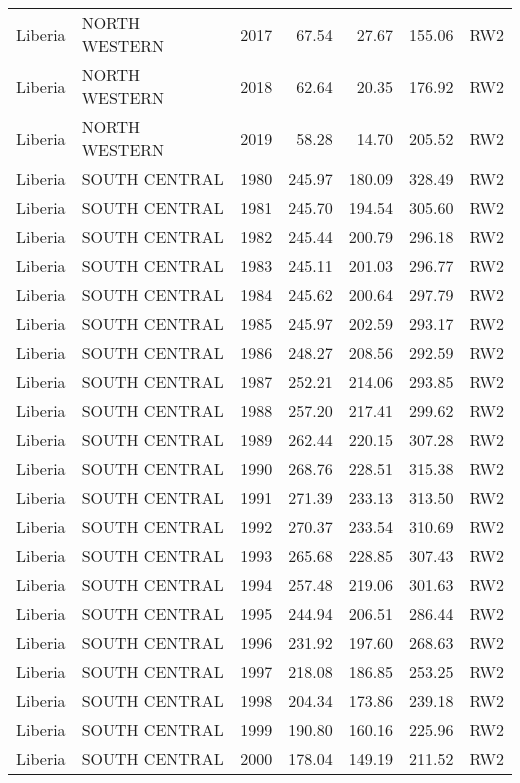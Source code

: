 \begin{longtable}{lllrrrl}
  Liberia & NORTH WESTERN & 2017 & 67.54 & 27.67 & 155.06 & RW2 \\ 
  Liberia & NORTH WESTERN & 2018 & 62.64 & 20.35 & 176.92 & RW2 \\ 
  Liberia & NORTH WESTERN & 2019 & 58.28 & 14.70 & 205.52 & RW2 \\ 
  Liberia & SOUTH CENTRAL & 1980 & 245.97 & 180.09 & 328.49 & RW2 \\ 
  Liberia & SOUTH CENTRAL & 1981 & 245.70 & 194.54 & 305.60 & RW2 \\ 
  Liberia & SOUTH CENTRAL & 1982 & 245.44 & 200.79 & 296.18 & RW2 \\ 
  Liberia & SOUTH CENTRAL & 1983 & 245.11 & 201.03 & 296.77 & RW2 \\ 
  Liberia & SOUTH CENTRAL & 1984 & 245.62 & 200.64 & 297.79 & RW2 \\ 
  Liberia & SOUTH CENTRAL & 1985 & 245.97 & 202.59 & 293.17 & RW2 \\ 
  Liberia & SOUTH CENTRAL & 1986 & 248.27 & 208.56 & 292.59 & RW2 \\ 
  Liberia & SOUTH CENTRAL & 1987 & 252.21 & 214.06 & 293.85 & RW2 \\ 
  Liberia & SOUTH CENTRAL & 1988 & 257.20 & 217.41 & 299.62 & RW2 \\ 
  Liberia & SOUTH CENTRAL & 1989 & 262.44 & 220.15 & 307.28 & RW2 \\ 
  Liberia & SOUTH CENTRAL & 1990 & 268.76 & 228.51 & 315.38 & RW2 \\ 
  Liberia & SOUTH CENTRAL & 1991 & 271.39 & 233.13 & 313.50 & RW2 \\ 
  Liberia & SOUTH CENTRAL & 1992 & 270.37 & 233.54 & 310.69 & RW2 \\ 
  Liberia & SOUTH CENTRAL & 1993 & 265.68 & 228.85 & 307.43 & RW2 \\ 
  Liberia & SOUTH CENTRAL & 1994 & 257.48 & 219.06 & 301.63 & RW2 \\ 
  Liberia & SOUTH CENTRAL & 1995 & 244.94 & 206.51 & 286.44 & RW2 \\ 
  Liberia & SOUTH CENTRAL & 1996 & 231.92 & 197.60 & 268.63 & RW2 \\ 
  Liberia & SOUTH CENTRAL & 1997 & 218.08 & 186.85 & 253.25 & RW2 \\ 
  Liberia & SOUTH CENTRAL & 1998 & 204.34 & 173.86 & 239.18 & RW2 \\ 
  Liberia & SOUTH CENTRAL & 1999 & 190.80 & 160.16 & 225.96 & RW2 \\ 
  Liberia & SOUTH CENTRAL & 2000 & 178.04 & 149.19 & 211.52 & RW2 \\ 

\end{longtable}
